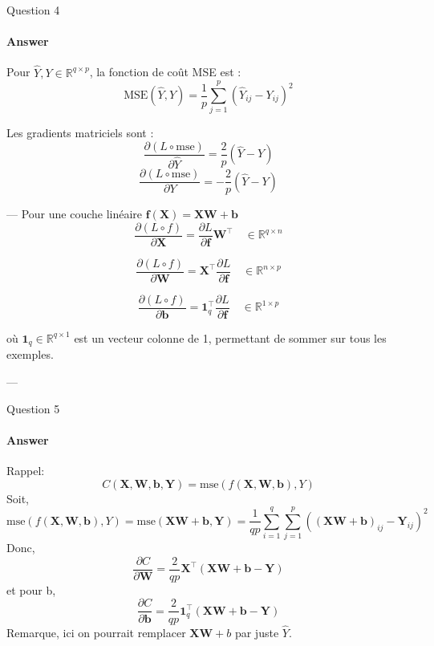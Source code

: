 \documentclass[12pt,a4paper]{article}
\begin{document}
\begin{section}{Question 4}

\paragraph{Answer}

Pour \(\hat{Y}, Y \in \mathbb{R}^{q \times p}\), la fonction de coût MSE est :  
\[
\text{MSE}(\hat{Y}, Y) = \frac{1}{p} \sum_{j=1}^{p} (\hat{Y}_{ij} - Y_{ij})^2
\]

Les gradients matriciels sont :  
\[
\frac{\partial (L \circ \text{mse})}{\partial \hat{Y}} = \frac{2}{p} (\hat{Y} - Y) 
\]  
\[
\frac{\partial (L \circ \text{mse})}{\partial Y} = -\frac{2}{p} (\hat{Y} - Y) 
\]

---
Pour une couche linéaire  
\(\mathbf{f}(\mathbf{X}) = \mathbf{X}\mathbf{W} + \mathbf{b}\)  
\[
\frac{\partial (L \circ f)}{\partial \mathbf{X}} = \frac{\partial L}{\partial \mathbf{f}} \mathbf{W}^\top \quad \in \mathbb{R}^{q \times n}
\]

\[
\frac{\partial (L \circ f)}{\partial \mathbf{W}} = \mathbf{X}^\top \frac{\partial L}{\partial \mathbf{f}} \quad \in \mathbb{R}^{n \times p}
\]

\[
\frac{\partial (L \circ f)}{\partial \mathbf{b}} = \mathbf{1}_q^\top \frac{\partial L}{\partial \mathbf{f}} \quad \in \mathbb{R}^{1 \times p}
\]

où \(\mathbf{1}_q \in \mathbb{R}^{q \times 1}\) est un vecteur colonne de 1, permettant de sommer sur tous les exemples.

---


\end{section}

\begin{section}{Question 5}

\paragraph{Answer}
Rappel: 
\[
C(\mathbf{X}, \mathbf{W}, \mathbf{b}, \mathbf{Y}) = \text{mse}(f(\mathbf{X}, \mathbf{W}, \mathbf{b}), Y)
\]
Soit,
\[
\text{mse}(f(\mathbf{X}, \mathbf{W}, \mathbf{b}), Y)
= \text{mse}(\mathbf{XW + b}, \mathbf{Y}) =
\frac{1}{qp} \sum_{i=1}^{q} \sum_{j=1}^{p} \left( (\mathbf{XW + b})_{ij} - \mathbf{Y}_{ij} \right)^2
\]
Donc,
\[
\frac{\partial C}{\partial \mathbf{W}} = \frac{2}{qp} \mathbf{X}^\top (\mathbf{XW + b - Y})
\]
et pour b,
\[
\frac{\partial C}{\partial \mathbf{b}} = \frac{2}{qp} \mathbf{1}_q^\top (\mathbf{XW + b - Y})
\]
Remarque, ici on pourrait remplacer $\mathbf{X}\mathbf{W} + b$ par juste $\hat{Y}$.

\end{section}
\end{document}
